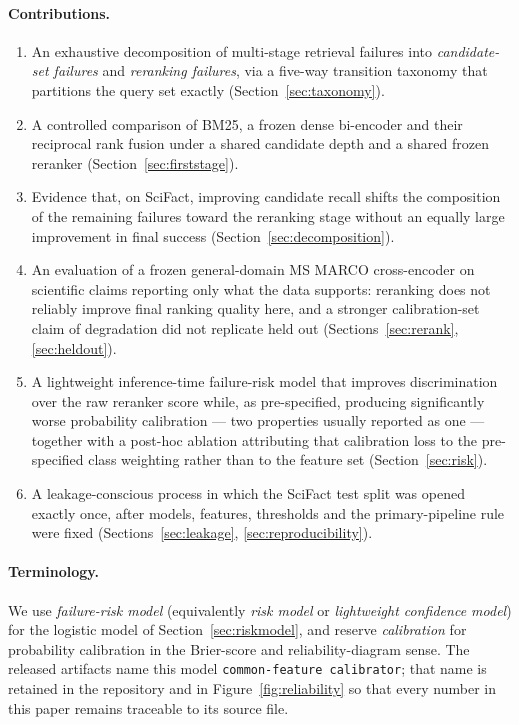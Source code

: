 \documentclass[11pt,a4paper]{article}
\begin{document}
\paragraph{Contributions.}
\begin{enumerate}
  \item An exhaustive decomposition of multi-stage retrieval failures into
        \emph{candidate-set failures} and \emph{reranking failures}, via a five-way transition
        taxonomy that partitions the query set exactly (Section~\ref{sec:taxonomy}).
  \item A controlled comparison of BM25, a frozen dense bi-encoder and their reciprocal rank
        fusion under a shared candidate depth and a shared frozen reranker
        (Section~\ref{sec:firststage}).
  \item Evidence that, on SciFact, improving candidate recall shifts the composition of the
        remaining failures toward the reranking stage without an equally large improvement in
        final success (Section~\ref{sec:decomposition}).
  \item An evaluation of a frozen general-domain MS MARCO cross-encoder on scientific claims
        reporting only what the data supports: reranking does not reliably improve final
        ranking quality here, and a stronger calibration-set claim of degradation did not
        replicate held out (Sections~\ref{sec:rerank}, \ref{sec:heldout}).
  \item A lightweight inference-time failure-risk model that improves discrimination over the
        raw reranker score while, as pre-specified, producing significantly worse probability
        calibration --- two properties usually reported as one --- together with a post-hoc
        ablation attributing that calibration loss to the pre-specified class weighting rather
        than to the feature set (Section~\ref{sec:risk}).
  \item A leakage-conscious process in which the SciFact test split was opened exactly once,
        after models, features, thresholds and the primary-pipeline rule were fixed
        (Sections~\ref{sec:leakage}, \ref{sec:reproducibility}).
\end{enumerate}

\paragraph{Terminology.}
We use \emph{failure-risk model} (equivalently \emph{risk model} or \emph{lightweight
confidence model}) for the logistic model of Section~\ref{sec:riskmodel}, and reserve
\emph{calibration} for probability calibration in the Brier-score and reliability-diagram
sense. The released artifacts name this model \texttt{common-feature calibrator}; that name is
retained in the repository and in Figure~\ref{fig:reliability} so that every number in this
paper remains traceable to its source file.
\end{document}
